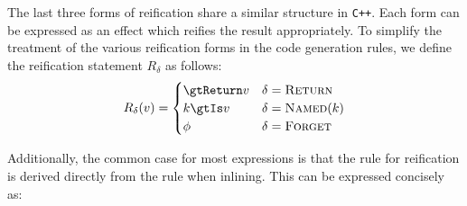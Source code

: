 \documentclass{article}
\begin{document}
    The last three forms of reification share a similar structure in \texttt{C++}. Each form can be
    expressed as an effect which reifies the result appropriately. To simplify the treatment of the
    various reification forms in the code generation rules, we define the reification statement
    $R_\delta$ as follows:
%
    \begin{align*}
        R_\delta(v) = \begin{cases}
            \gtReturn v & \delta = \textsc{Return} \\
            k \gtIs v & \delta = \textsc{Named$(k)$} \\
            \phi & \delta = \textsc{Forget}
        \end{cases}
    \end{align*}

    Additionally, the common case for most expressions is that the rule for reification is derived
    directly from the rule when inlining. This can be expressed concisely as:
%
    \begin{mathpar}
    \end{mathpar}
\end{document}
